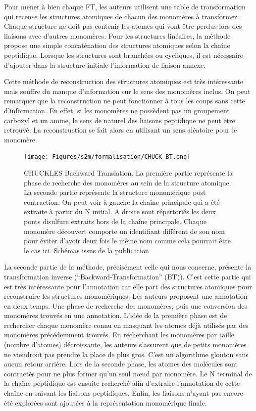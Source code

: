 Pour mener à bien chaque FT, les auteurs utilisent une table de transformation qui recense les structures atomiques de chacun des monomères à transformer.
Chaque structure ne doit pas contenir les atomes qui vont être perdus lors des liaisons avec d'autres monomères.
Pour les structures linéaires, la méthode propose une simple concaténation des structures atomiques selon la chaîne peptidique.
Lorsque les structures sont branchées ou cycliques, il est nécessaire d'ajouter dans la structure initiale l'information de liaison annexe.

Cette méthode de reconstruction des structures atomiques est très intéressante mais souffre du manque d'information sur le sens des monomères inclus.
On peut remarquer que la reconstruction ne peut fonctionner à tous les coups sans cette d'information.
En effet, si les monomères ne possèdent pas un groupement carboxyl et un amine, le sens de naturel des liaisons peptidique ne peut être retrouvé.
La reconstruction se fait alors en utilisant un sens aléatoire pour le monomère.

\begin{figure}[!ht]
  \begin{center}
    \texttt{[image: Figures/s2m/formalisation/CHUCK\_BT.png]}
    \caption{\label{chuck_bt}CHUCKLES Backward Translation.
    La première partie représente la phase de recherche des monomères au sein de la structure atomique.
    La seconde partie représente la structure monomérique post contraction.
    On peut voir à gauche la chaîne principale qui a été extraite à partir du N initial.
    A droite sont répertoriés les deux ponts disulfure extraits hors de la chaîne principale.
    Chaque monomère découvert comporte un identifiant différent de son nom pour éviter d'avoir deux fois le même nom comme cela pourrait être le cas ici.
    Schémas issus de la publication~\cite{siani_chuckles:_1994}}
  \end{center}
\end{figure}

La seconde partie de la méthode, précisément celle qui nous concerne, présente la transformation inverse (``Backward-Transformation'' (BT)).
C'est cette partie qui est très intéressante pour l'annotation car elle part des structures atomiques pour reconstruire les structures monomériques.
Les auteurs proposent une annotation en deux temps.
Une phase de recherche des monomères, puis une conversion des monomères trouvés en une annotation.
L'idée de la première phase est de rechercher chaque monomère connu en masquant les atomes déjà utilisés par des monomères précédemment trouvés.
En recherchant les monomères par taille (nombre d'atomes) décroissante, les auteurs s'assurent que de petits monomères ne viendront pas prendre la place de plus gros.
C'est un algorithme glouton sans aucun retour arrière.
Lors de la seconde phase, les atomes des molécules sont contractés pour ne plus former qu'un seul n\oe{}ud par monomère.
Le N terminal de la chaîne peptidique est ensuite recherché afin d'extraire l'annotation de cette chaîne en suivant les liaisons peptidiques.
Enfin, les liaisons n'ayant pas encore été explorées sont ajoutées à la représentation monomérique finale.


